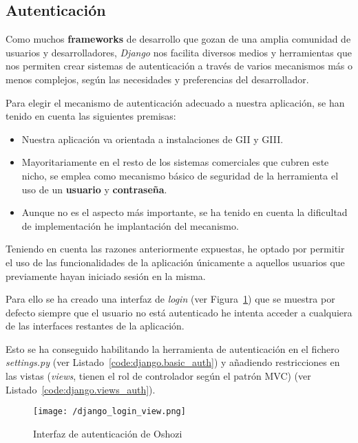 \subsection{Autenticación}

Como muchos \textbf{frameworks} de desarrollo que gozan de una amplia comunidad de usuarios y desarrolladores, \textit{Django} nos facilita diversos medios y herramientas que nos permiten crear sistemas de autenticación a través de varios mecanismos más o menos complejos, según las necesidades y preferencias del desarrollador.

Para elegir el mecanismo de autenticación adecuado a nuestra aplicación, se han tenido en cuenta las siguientes premisas:

\begin{itemize} 
\item Nuestra aplicación va orientada a instalaciones de \acs{GII} y \acs{GIII}.
\item Mayoritariamente en el resto de los sistemas comerciales que cubren este nicho, se emplea como mecanismo básico de seguridad de la herramienta el uso de un \textbf{usuario} y \textbf{contraseña}.
\item Aunque no es el aspecto más importante, se ha tenido en cuenta la dificultad de implementación he implantación del mecanismo.
\end{itemize}
 
Teniendo en cuenta las razones anteriormente expuestas, he optado por permitir el uso de las funcionalidades de la aplicación únicamente a aquellos usuarios que previamente hayan iniciado sesión en la misma. 

Para ello se ha creado una interfaz de \textit{login} (ver Figura~\ref{fig:django_login_view}) que se muestra por defecto siempre que el usuario no está autenticado he intenta acceder a cualquiera de las interfaces restantes de la aplicación.

Esto se ha conseguido habilitando la herramienta de autenticación en el fichero \textit{settings.py} (ver Listado~\ref{code:django.basic_auth}) y añadiendo restricciones en las vistas (\textit{views}, tienen el rol de controlador según el patrón \acs{MVC}) (ver Listado~\ref{code:django.views_auth}).

\begin{figure}[h]
\centering
\texttt{[image: /django\_login\_view.png]}
\caption{Interfaz de autenticación de Oshozi}
\label{fig:django_login_view}
\end{figure}


